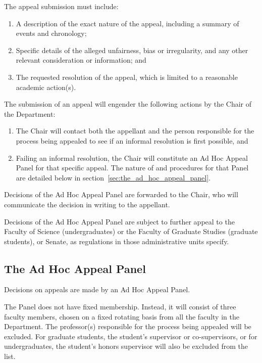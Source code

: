  The appeal submission must include:
\begin{enumerate}

\item A description of the exact nature of the appeal, including a summary of
events and chronology; 

\item Specific details of the alleged unfairness, bias or irregularity, and any
other relevant consideration or information; and 

\item The requested resolution of the appeal, which is limited to a reasonable
academic action(s). 

\end{enumerate}

 The submission of an appeal will engender the following actions by
the Chair of the Department:
\begin{enumerate}

\item The Chair will contact both the appellant and the person responsible for
the process being appealed to see if an informal resolution is first possible, and

\item Failing an informal resolution, the Chair will constitute an Ad Hoc
Appeal Panel for that specific appeal.  The nature of and procedures for that
Panel are detailed below in section~\ref{sec:the_ad_hoc_appeal_panel}.

\end{enumerate}

 Decisions of the Ad Hoc Appeal Panel are forwarded to the Chair, who
will communicate the decision in writing to the appellant.

 Decisions of the Ad Hoc Appeal Panel are subject to further appeal to
the Faculty of Science (undergraduates) or the Faculty of Graduate Studies
(graduate students), or Senate, as regulations in those administrative units
specify. 


\subsection{\label{sec:the_ad_hoc_appeal_panel}The Ad Hoc Appeal Panel}

 Decisions on appeals are made by an Ad Hoc Appeal Panel.

 The Panel does not have fixed membership.  Instead, it will consist
of three faculty members, chosen on a fixed rotating basis from all the faculty
in the Department.  The professor(s) responsible for the process being appealed
will be excluded.  For graduate students, the student’s supervisor or
co-supervisors, or for undergraduates, the student’s honors supervisor will
also be excluded from the list.  

